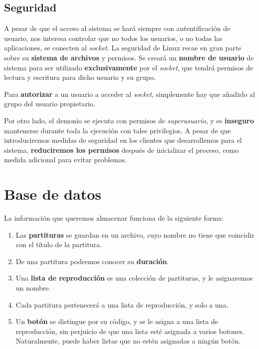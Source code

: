 \smallskip

\subsection{Seguridad}

A pesar de que el acceso al sistema se hará siempre con autentificación de usuario, nos interesa controlar que no todos los usuarios, o no todas las aplicaciones, se conecten al \textit{socket}. La seguridad de Linux recae en gran parte sobre su \textbf{sistema de archivos} y permisos. Se creará un \textbf{nombre de usuario} de sistema para ser utilizado \textbf{exclusivamente} por el \textit{socket}, que tendrá permisos de lectura y escritura para dicho usuario y su grupo.

Para \textbf{autorizar} a un usuario a acceder al \textit{socket}, simplemente hay que añadirlo al grupo del usuario propietario.

Por otro lado, el demonio se ejecuta con permisos de \textit{superusuario}, y es \textbf{inseguro} mantenerse durante toda la ejecución con tales privilegios. A pesar de que introduciremos medidas de seguridad en los clientes que desarrollemos para el sistema, \textbf{reduciremos los permisos} después de inicializar el proceso, como medida adicional para evitar problemas.

\newpage

\section{Base de datos}
\label{sec:database}

La información que queremos almacenar funciona de la siguiente forma:

\begin{enumerate}
	\item Las \textbf{partituras} se guardan en un archivo, cuyo nombre no tiene que coincidir con el título de la partitura.
	\item De una partitura podremos conocer su \textbf{duración}.
	\item Una \textbf{lista de reproducción} es una colección de partituras, y le asignaremos un nombre.
	\item Cada partitura pertenecerá a una lista de reproducción, y solo a una.
	\item Un \textbf{botón} se distingue por su código, y se le asigna a una lista de reproducción, sin perjuicio de que una lista esté asignada a varios botones. Naturalmente, puede haber listas que no estén asignadas a ningún botón.
\end{enumerate}

